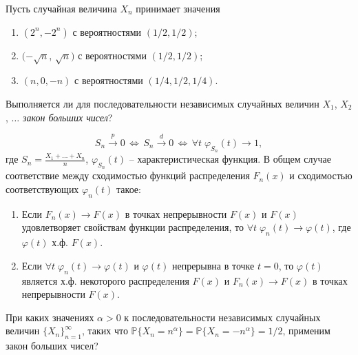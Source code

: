 
\begin{problem}
Пусть случайная величина $X_n$ принимает значения 
\begin{enumerate}
\item $(2^n, -2^n)$ с вероятностями $(1/2, 1/2)$;
\item $(-\sqrt{n}$, $\sqrt{n})$ с вероятностями $(1/2, 1/2)$;
\item $(n, 0, -n)$ с вероятностями $(1/4, 1/2, 1/4)$.
\end{enumerate}
Выполняется ли для последовательности независимых случайных величин 
$X_1$, $X_2$, $\ldots$ \textit{закон больших чисел}? 
\end{problem}

\begin{ordre}
 
\[
S_n\xrightarrow{p}0 \,\Leftrightarrow\, S_n\xrightarrow{d}0 \,\Leftrightarrow\, \forall t \; \varphi_{S_n}(t) \to 1,   
\]
\noindent где $S_n=\frac{X_1+\ldots +X_n}{n}$, $\varphi_{S_n}(t)$ -- характеристическая функция. В общем случае соответствие между сходимостью функций распределения $F_n(x)$ и сходимостью соответствующих $\varphi_n(t)$ такое:
\begin{enumerate}
\item Если $F_n(x) \to F(x)$ в точках непрерывности $F(x)$ и $F(x)$ удовлетворяет свойствам функции распределения, то $\forall t \; \varphi_n(t) \to \varphi(t)$, где $\varphi(t)$ х.ф. $F(x)$.
\item Если $\forall t \; \varphi_n(t) \to \varphi(t)$ и $\varphi(t)$ непрерывна в точке $t = 0$, то $\varphi(t)$ является х.ф. некоторого распределения $F(x)$  и $F_n(x) \to F(x)$ в точках непрерывности $F(x)$.

\end{enumerate}

\end{ordre}


\begin{problem}
При каких значениях $\alpha > 0$ к последовательности независимых случайных величин $\{ X_n\}_{n=1}^{\infty}$, 
таких что ${\mathbb P}\{ X_n=n^{\alpha}\}={\mathbb P}\{ X_n=-n^{\alpha}\}=1/2$, применим закон больших чисел? 
\end{problem}

\begin{comment}
\begin{ordre}
Докажите достаточное условие выполнения ЗБЧ:
 \[
Var S_n \xrightarrow {n\to\infty}0
\] 
\end{ordre}
\end{comment}


